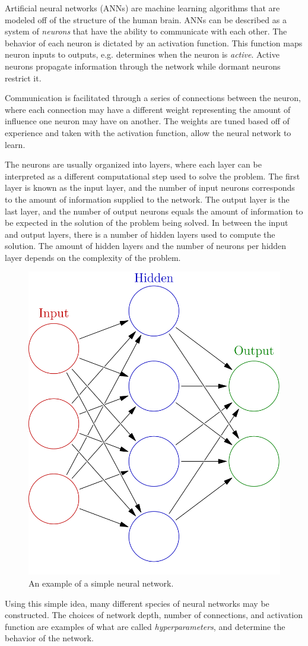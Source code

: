 \documentclass[twoside]{article}
\begin{document}
\begin{multicols}{2}
Artificial neural networks (ANNs) are machine learning algorithms that are modeled off of the structure of the human brain. ANNs can be described as a system of \textit{neurons} that have the ability to communicate with each other. The behavior of each neuron is dictated by an activation function. This function maps neuron inputs to outputs, e.g. determines when the neuron is \textit{active}. Active neurons propagate information through the network while dormant neurons restrict it.  \par Communication is facilitated through a series of connections between the neuron, where each connection may have a different weight representing the amount of influence one neuron may have on another. The weights are tuned based off of experience and taken with the activation function, allow the neural network to learn. \par The neurons are usually organized into layers, where each layer can be interpreted as a different computational step used to solve the problem. The first layer is known as the input layer, and the number of input neurons corresponds to the amount of information supplied to the network. The output layer is the last layer, and the number of output neurons equals the amount of information to be expected in the solution of the problem being solved. In between the input and output layers, there is a number of hidden layers used to compute the solution. The amount of hidden layers and the number of neurons per hidden layer depends on the complexity of the problem.
\begin{figure}[H]
	\centering
	\includegraphics[width=0.5\linewidth]{images/neural}
	\caption{An example of a simple neural network.}
\end{figure}
Using this simple idea, many different species of neural networks may be constructed. The choices of network depth, number of connections, and activation function are examples of what are called \textit{hyperparameters}, and determine the behavior of the network.


\end{multicols}
\end{document}
